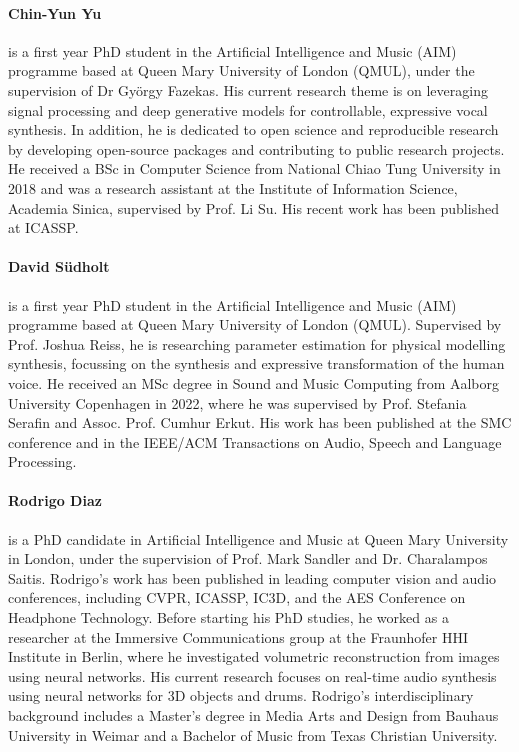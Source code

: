 \paragraph{Chin-Yun Yu} is a first year PhD student in the Artificial Intelligence and Music (AIM) programme based at Queen Mary University of London (QMUL), under the supervision of Dr György Fazekas. His current research theme is on leveraging signal processing and deep generative models for controllable, expressive vocal synthesis. In addition, he is dedicated to open science and reproducible research by developing open-source packages and contributing to public research projects. He received a BSc in Computer Science from National Chiao Tung University in 2018 and was a research assistant at the Institute of Information Science, Academia Sinica, supervised by Prof. Li Su. His recent work has been published at ICASSP.

\paragraph{David Südholt} is a first year PhD student in the Artificial Intelligence and Music (AIM) programme based at Queen Mary University of London (QMUL). Supervised by Prof. Joshua Reiss, he is researching parameter estimation for physical modelling synthesis, focussing on the synthesis and expressive transformation of the human voice. He received an MSc degree in Sound and Music Computing from Aalborg University Copenhagen in 2022, where he was supervised by Prof. Stefania Serafin and Assoc. Prof. Cumhur Erkut. His work has been published at the SMC conference and in the IEEE/ACM Transactions on Audio, Speech and Language Processing.

\paragraph{Rodrigo Diaz} is a PhD candidate in Artificial Intelligence and Music at Queen Mary University in London, under the supervision of Prof. Mark Sandler and Dr. Charalampos Saitis. Rodrigo's work has been published in leading computer vision and audio conferences, including CVPR, ICASSP, IC3D, and the AES Conference on Headphone Technology. Before starting his PhD studies, he worked as a researcher at the Immersive Communications group at the Fraunhofer HHI Institute in Berlin, where he investigated volumetric reconstruction from images using neural networks. His current research focuses on real-time audio synthesis using neural networks for 3D objects and drums. Rodrigo's interdisciplinary background includes a Master's degree in Media Arts and Design from Bauhaus University in Weimar and a Bachelor of Music from Texas Christian University.

